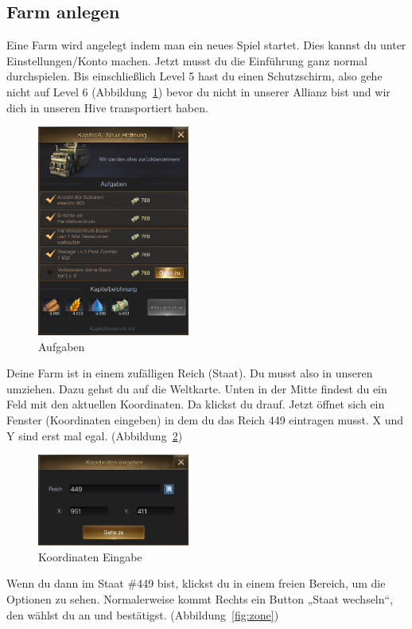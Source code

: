 \documentclass[fontsize=12pt,a4paper]{scrartcl}[2003/01/01]
\begin{document}
\subsection{Farm anlegen}
Eine Farm wird angelegt indem man ein neues Spiel startet. Dies kannst du unter Einstellungen/Konto machen.
Jetzt musst du die Einführung ganz normal durchspielen. Bis einschließlich Level 5 hast du einen Schutzschirm,
also gehe nicht auf Level 6 (Abbildung~\ref{fig:aufgaben}) bevor du nicht in unserer Allianz bist und wir dich in unseren Hive transportiert haben.

\begin{figure}[H] 
  \centering
     \includegraphics[width=5cm]{Bilder/IMG_E0002.JPG}
  \caption{Aufgaben}
  \label{fig:aufgaben}
\end{figure}

Deine Farm ist in einem zufälligen Reich (Staat). Du musst also in unseren umziehen. Dazu gehst du auf die Weltkarte.
Unten in der Mitte findest du ein Feld mit den aktuellen Koordinaten. Da klickst du drauf. Jetzt öffnet sich ein 
Fenster (Koordinaten eingeben) in dem du das Reich 449 eintragen musst. X und Y sind erst mal egal. (Abbildung~\ref{fig:koordinaten})

\begin{figure}[H] 
  \centering
     \includegraphics[width=5cm]{Bilder/IMG_E0004.JPG}
  \caption{Koordinaten Eingabe}
  \label{fig:koordinaten}
\end{figure}

Wenn du dann im Staat \#449 bist, klickst du in einem freien Bereich, um die Optionen zu sehen. Normalerweise kommt Rechts ein
Button „Staat wechseln“, den wählst du an und bestätigst.  (Abbildung~\ref{fig:zone})
\end{document}
